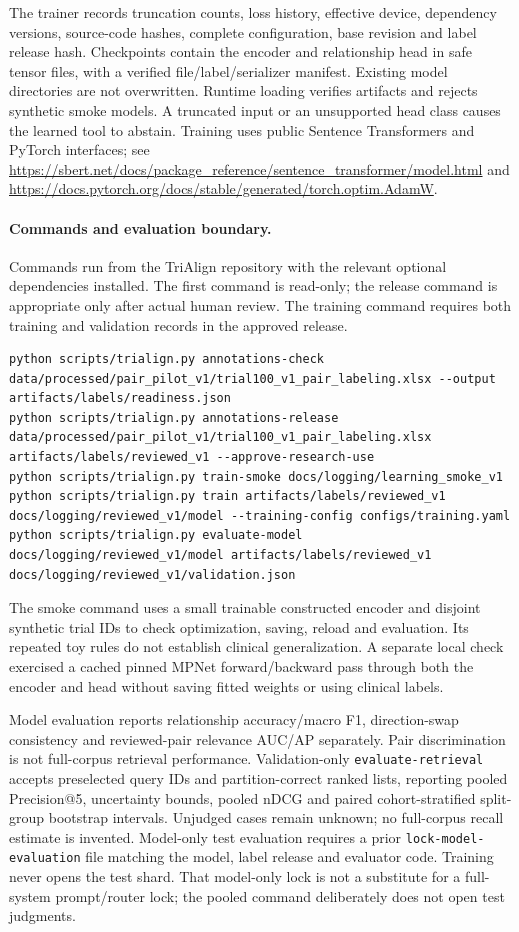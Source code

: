 \documentclass[10pt,letterpaper]{article}
\newcommand{\pathcode}[1]{\nolinkurl{#1}}
\begin{document}
The trainer records truncation counts, loss history, effective device, dependency
versions, source-code hashes, complete configuration, base revision and label
release hash. Checkpoints contain the encoder and relationship head in safe
tensor files, with a verified file/label/serializer manifest. Existing model
directories are not overwritten. Runtime loading verifies artifacts and rejects
synthetic smoke models. A truncated input or an unsupported head class causes
the learned tool to abstain. Training uses public Sentence Transformers and
PyTorch interfaces; see
\url{https://sbert.net/docs/package_reference/sentence_transformer/model.html}
and \url{https://docs.pytorch.org/docs/stable/generated/torch.optim.AdamW}.

\paragraph{Commands and evaluation boundary.}
Commands run from the TriAlign repository with the relevant optional
dependencies installed. The first command is read-only; the release command
is appropriate only after actual human review. The training command requires
both training and validation records in the approved release.
\begin{Verbatim}[breaklines=true,fontsize=\small]
python scripts/trialign.py annotations-check data/processed/pair_pilot_v1/trial100_v1_pair_labeling.xlsx --output artifacts/labels/readiness.json
python scripts/trialign.py annotations-release data/processed/pair_pilot_v1/trial100_v1_pair_labeling.xlsx artifacts/labels/reviewed_v1 --approve-research-use
python scripts/trialign.py train-smoke docs/logging/learning_smoke_v1
python scripts/trialign.py train artifacts/labels/reviewed_v1 docs/logging/reviewed_v1/model --training-config configs/training.yaml
python scripts/trialign.py evaluate-model docs/logging/reviewed_v1/model artifacts/labels/reviewed_v1 docs/logging/reviewed_v1/validation.json
\end{Verbatim}
The smoke command uses a small trainable constructed encoder and disjoint
synthetic trial IDs to check optimization, saving, reload and evaluation. Its
repeated toy rules do not establish clinical generalization. A separate local
check exercised a cached pinned MPNet forward/backward pass through both the
encoder and head without saving fitted weights or using clinical labels.

Model evaluation reports relationship accuracy/macro F1, direction-swap
consistency and reviewed-pair relevance AUC/AP separately. Pair discrimination
is not full-corpus retrieval performance. Validation-only
\pathcode{evaluate-retrieval} accepts preselected query IDs and partition-correct
ranked lists, reporting pooled Precision@5, uncertainty bounds, pooled nDCG
and paired cohort-stratified split-group bootstrap intervals. Unjudged cases
remain unknown; no full-corpus recall estimate is invented. Model-only test
evaluation requires a prior \pathcode{lock-model-evaluation} file matching the
model, label release and evaluator code. Training never opens the test shard.
That model-only lock is not a substitute for a full-system prompt/router lock;
the pooled command deliberately does not open test judgments.
\end{document}
